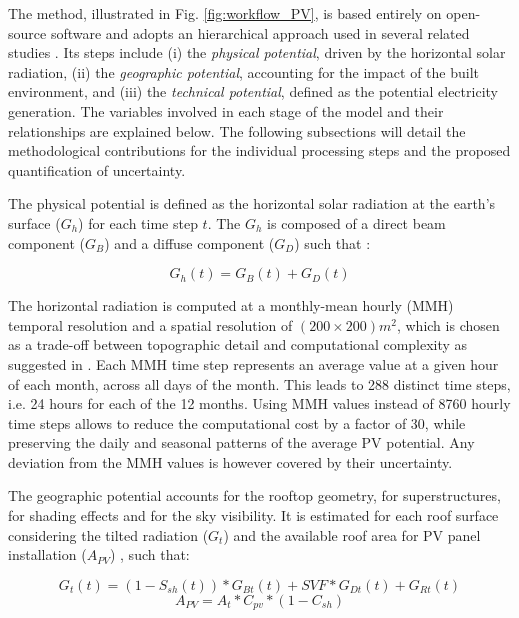 The method, illustrated in Fig. \ref{fig:workflow_PV}, is based entirely on open-source software and adopts an hierarchical approach used in several related studies \cite{izquierdo_method_2008, ramirez_camargo_spatio-temporal_2015, assouline_quantifying_2017}. Its steps include 
(i) the \textit{physical potential}, driven by the horizontal solar radiation, 
(ii) the \textit{geographic potential}, accounting for the impact of the built environment, and
(iii) the \textit{technical potential}, defined as the potential electricity generation.
The variables involved in each stage of the model and their relationships are explained below. The following subsections will detail the methodological contributions for the individual processing steps and the proposed quantification of uncertainty.

The physical potential is defined as the horizontal solar radiation at the earth's surface ($G_h$) for each time step $t$. The $G_h$ is composed of a direct beam component ($G_B$) and a diffuse component ($G_D$) such that \cite{loutzenhiser_empirical_2007}:

\begin{equation}
\label{eq:Gh}
G_{h}(t) = G_{B}(t) + G_{D}(t)
\end{equation}

The horizontal radiation is computed at a monthly-mean hourly (MMH) temporal resolution and a spatial resolution of $(200 \times 200)m^2$, 
which is chosen as a trade-off between topographic detail and computational complexity as suggested in \cite{izquierdo_method_2008, assouline_large-scale_2018}. 
Each MMH time step represents an average value at a given hour of each month, across all days of the month. This leads to 288 distinct time steps, i.e. 24 hours for each of the 12 months. 
Using MMH values instead of 8760 hourly time steps allows to reduce the computational cost by a factor of 30, while preserving the daily and seasonal patterns of the average PV potential.
Any deviation from the MMH values is however covered by their uncertainty.

The geographic potential accounts for the rooftop geometry, for superstructures, for shading effects and for the sky visibility. It is estimated for each roof surface considering the tilted radiation ($G_t$) and the available roof area for PV panel installation ($A_{PV}$)  \cite{assouline_large-scale_2018}, such that:

\begin{equation}
\label{eq:irrad}
G_{t}(t) = (1-S_{sh}(t)) * G_{Bt}(t) + SVF * G_{Dt}(t) + G_{Rt}(t)
\end{equation}
\begin{equation}
\label{eq:area}
A_{PV} = A_{t} * C_{pv} * (1 - C_{sh})
\end{equation}

